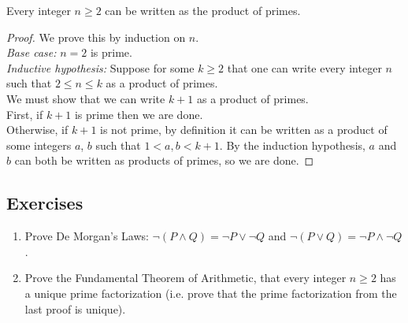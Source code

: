 \documentclass{article}
\begin{document}
\begin{example}
Every integer $n \geq 2$ can be written as the product of primes.
\end{example}

\begin{proof}
We prove this by induction on $n$. \\

{\it Base case:} $n = 2$ is prime. \\

{\it Inductive hypothesis:} Suppose for some $k \geq 2$ that one can write every integer $n$ such that $2 \leq n \leq k$ as a product of primes. \\

We must show that we can write $k+1$ as a product of primes. \\
First, if $k+1$ is prime then we are done.  \\

Otherwise, if $k+1$ is not prime, by definition it can be written as a product of some integers $a$, $b$ such that $1 < a,b < k+1$. 
By the induction hypothesis, $a$ and $b$ can both be written as products of primes, so we are done.
\end{proof}


\subsection{Exercises}
\begin{enumerate}
\item Prove De Morgan's Laws: $\neg (P \wedge Q) = \neg P \vee \neg Q$ and $\neg (P \vee Q) = \neg P \wedge \neg Q$ .
\item Prove the Fundamental Theorem of Arithmetic, that every integer $n \geq 2$ has a unique prime factorization (i.e. prove that the prime factorization from the last proof is unique).
\end{enumerate}
\end{document}
